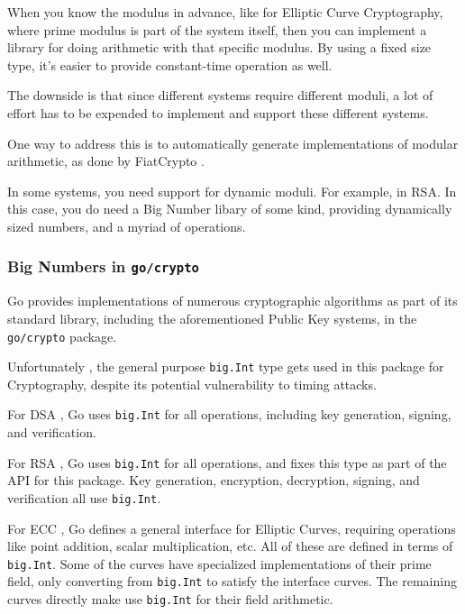 \documentclass[11pt, a4paper]{article} %
\begin{document}
{When you know the modulus in advance, like for Elliptic Curve Cryptography,
where prime modulus is part of the system itself, then you
can implement a library for doing arithmetic with that specific modulus.
By using a fixed size type, it's easier to provide constant-time operation
as well.

The downside is that since different systems require different moduli,
a lot of effort has to be expended to implement and support
these different systems.

One way to address this is to automatically generate implementations
of modular arithmetic, as done by FiatCrypto
\cite{hvass_high-assurance_nodate}.

In some systems, you need support for dynamic moduli. For example,
in RSA. In this case, you do need a Big Number libary of some kind,
providing dynamically sized numbers, and a myriad of operations.


\subsubsection{Big Numbers in \texttt{go/crypto}}

Go \cite{the_go_authors_go_nodate} provides implementations of numerous
cryptographic algorithms as part of its standard library,
including the aforementioned Public Key systems, in the
\texttt{go/crypto} package.

Unfortunately \cite{ford_proposal_2017}, the general purpose
\texttt{big.Int} type gets used in this package for Cryptography,
despite its potential vulnerability to timing attacks.

For DSA \cite{technology_digital_1994}, Go uses \texttt{big.Int}
for all operations, including key generation, signing, and verification.

For RSA \cite{rivest_method_1978}, Go uses \texttt{big.Int}
for all operations, and fixes this type as part of the API for
this package. Key generation, encryption, decryption, signing,
and verification all use \texttt{big.Int}.

For ECC \cite{miller_use_1986}, Go defines a general interface
for Elliptic Curves, requiring operations like point addition,
scalar multiplication, etc. All of these are defined in terms
of \texttt{big.Int}. Some of the curves have specialized
implementations of their prime field, only converting from
\texttt{big.Int} to satisfy the interface curves. The remaining curves
directly make use \texttt{big.Int} for their field arithmetic.

}
\end{document}
